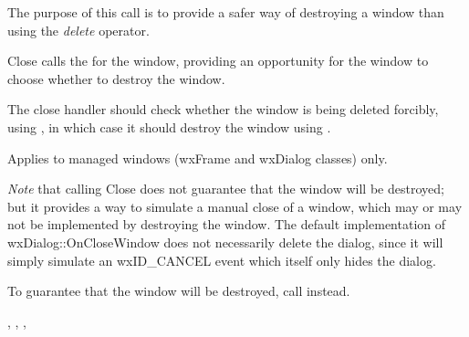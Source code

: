 


\label{wxwindowclose}


The purpose of this call is to provide a safer way of destroying a window than using
the {\it delete} operator.




Close calls the  for the window, providing an opportunity for the window to
choose whether to destroy the window.

The close handler should check whether the window is being deleted forcibly,
using , in which case it should
destroy the window using .

Applies to managed windows (wxFrame and wxDialog classes) only.

{\it Note} that calling Close does not guarantee that the window will be destroyed; but it
provides a way to simulate a manual close of a window, which may or may not be implemented by
destroying the window. The default implementation of wxDialog::OnCloseWindow does not
necessarily delete the dialog, since it will simply simulate an wxID\_CANCEL event which
itself only hides the dialog.

To guarantee that the window will be destroyed, call  instead.


,\rtfsp
{},\rtfsp
{},\rtfsp
{}


